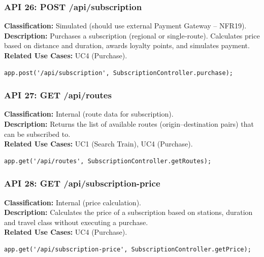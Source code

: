 \documentclass{article}
\begin{document}
\subsubsection*{API 26: POST /api/subscription}
\textbf{Classification:} Simulated (should use external Payment Gateway – NFR19).\\
\textbf{Description:} Purchases a subscription (regional or single‑route).
Calculates price based on distance and duration, awards loyalty points,
and simulates payment.\\
\textbf{Related Use Cases:} UC4 (Purchase).
\begin{verbatim}
app.post('/api/subscription', SubscriptionController.purchase);
\end{verbatim}

\subsubsection*{API 27: GET /api/routes}
\textbf{Classification:} Internal (route data for subscription).\\
\textbf{Description:} Returns the list of available routes (origin–destination pairs)
that can be subscribed to.\\
\textbf{Related Use Cases:} UC1 (Search Train), UC4 (Purchase).
\begin{verbatim}
app.get('/api/routes', SubscriptionController.getRoutes);
\end{verbatim}

\subsubsection*{API 28: GET /api/subscription-price}
\textbf{Classification:} Internal (price calculation).\\
\textbf{Description:} Calculates the price of a subscription based on stations,
duration and travel class without executing a purchase.\\
\textbf{Related Use Cases:} UC4 (Purchase).
\begin{verbatim}
app.get('/api/subscription-price', SubscriptionController.getPrice);
\end{verbatim}

\end{document}
